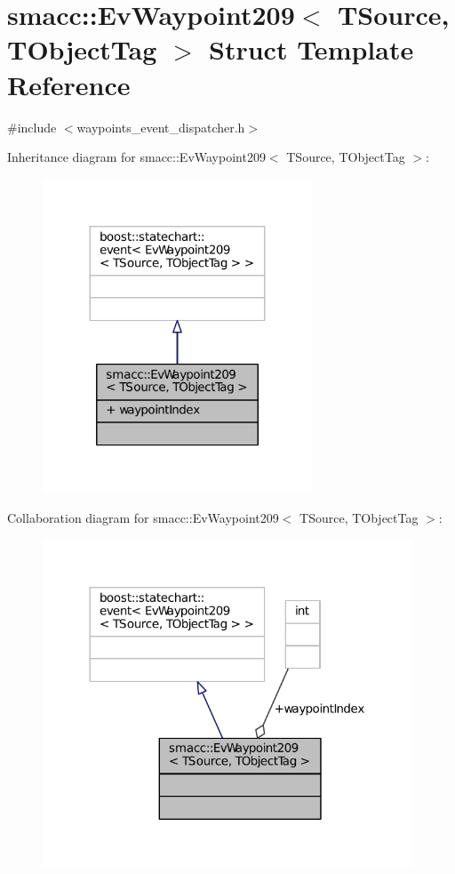 \hypertarget{structsmacc_1_1EvWaypoint209}{}\section{smacc\+:\+:Ev\+Waypoint209$<$ T\+Source, T\+Object\+Tag $>$ Struct Template Reference}
\label{structsmacc_1_1EvWaypoint209}


{\ttfamily \#include $<$waypoints\+\_\+event\+\_\+dispatcher.\+h$>$}



Inheritance diagram for smacc\+:\+:Ev\+Waypoint209$<$ T\+Source, T\+Object\+Tag $>$\+:
\nopagebreak
\begin{figure}[H]
\begin{center}
\leavevmode
\includegraphics[width=227pt]{structsmacc_1_1EvWaypoint209__inherit__graph}
\end{center}
\end{figure}


Collaboration diagram for smacc\+:\+:Ev\+Waypoint209$<$ T\+Source, T\+Object\+Tag $>$\+:
\nopagebreak
\begin{figure}[H]
\begin{center}
\leavevmode
\includegraphics[width=312pt]{structsmacc_1_1EvWaypoint209__coll__graph}
\end{center}
\end{figure}
